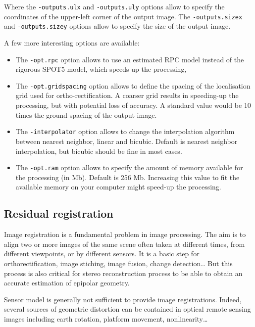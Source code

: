 Where the \verb?-outputs.ulx? and \verb?-outputs.uly? options allow to
specify the coordinates of the upper-left corner of the output image.
The \verb?-outputs.sizex? and \verb?-outputs.sizey? options allow to
specify the size of the output image.

A few more interesting options are available:
\begin{itemize}
\item The \verb?-opt.rpc? option allows to use an estimated RPC model
  instead of the rigorous SPOT5 model, which speeds-up the processing,
\item The \verb?-opt.gridspacing? option allows to define the spacing of the
  localisation grid used for ortho-rectification. A coarser grid
  results in speeding-up the processing, but with potential loss of
  accuracy. A standard value would be 10 times the ground spacing of
  the output image.
\item The \verb?-interpolator? option allows to change the interpolation
  algorithm between nearest neighbor, linear and bicubic. Default is nearest
  neighbor interpolation, but bicubic should be fine in most cases.
\item The \verb?-opt.ram? option allows to specify the amount of memory
  available for the processing (in Mb). Default is 256 Mb. Increasing
  this value to fit the available memory on your computer might
  speed-up the processing.
\end{itemize}


\subsection{Residual registration}\label{ssec:registration}

Image registration is a fundamental problem in image processing. The aim is to
align two or more images of the same scene often taken at different times, from
different viewpoints, or by different sensors. It is a basic step for
orthorectification, image stiching, image fusion, change detection\ldots
But this process is also critical for stereo reconstruction process to be able
to obtain an accurate estimation of epipolar geometry.

Sensor model is generally not sufficient to provide image registrations. Indeed,
several sources of geometric distortion can be contained in optical remote
sensing images including earth rotation, platform movement, nonlinearity\ldots

